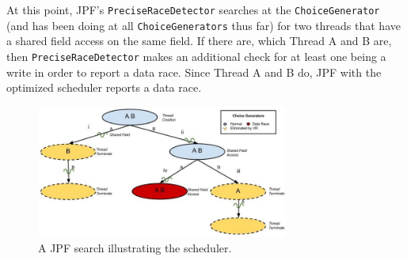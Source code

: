 At this point, JPF's \texttt{PreciseRaceDetector} searches at the \texttt{ChoiceGenerator} (and has been doing at all \texttt{ChoiceGenerators} thus far) for two threads that have a shared field access on the same field. If there are, which Thread A and B are, then \texttt{PreciseRaceDetector} makes an additional check for at least one being a write in order to report a data race. Since Thread A and B do, JPF with the optimized scheduler reports a data race.
\begin{figure}[t]
\begin{center}
\includegraphics[width=3.25in]{../figs/InformalProofDiagram}
\end{center}
\vspace{-10pt}
\caption{A JPF search illustrating the scheduler.}
\label{fig:proof}
\end{figure}
